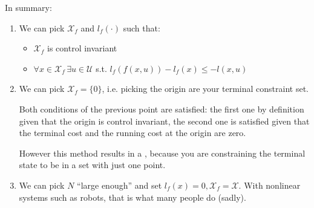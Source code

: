 In summary:
\begin{enumerate}
\item We can pick $\mathcal{X}_f$ and $l_f(\cdot)$ such that:
\begin{itemize}
\item $\mathcal{X}_f$ is control invariant
\item $\forall x \in \mathcal{X}_f\,\exists u \in \mathcal{U}$ s.t. $l_f(f(x,u)) - l_f(x) \le - l(x,u)$
\end{itemize}
\item We can pick $\mathcal{X}_f = \{0\}$, i.e. picking the origin are your terminal constraint set.

Both conditions of the previous point are satisfied: the first one by definition given that the origin is control invariant, the second one is satisfied given that the terminal cost and the running cost at the origin are zero.

However this method results in a , because you are constraining the terminal state to be in a set with just one point.
\item  We can pick $N$ ``large enough'' and set $l_f(x) = 0, \mathcal{X}_f = \mathcal{X}$. With nonlinear systems such as robots, that is what many people do (sadly).
\end{enumerate}

